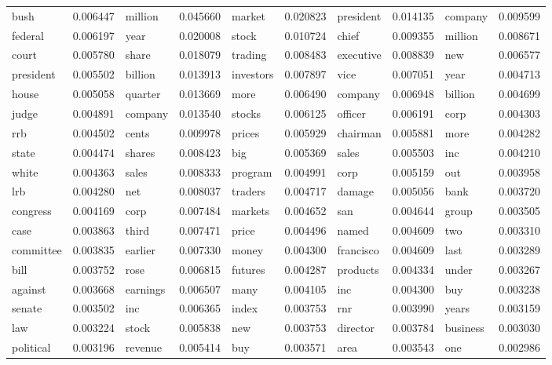 \begin{table}[!ht]
  \footnotesize
  \begin{tabular}{llllllllll}

bush & 0.006447 & million & 0.045660 & market & 0.020823 & president & 0.014135 & company & 0.009599\\
federal & 0.006197 & year & 0.020008 & stock & 0.010724 & chief & 0.009355 & million & 0.008671\\
court & 0.005780 & share & 0.018079 & trading & 0.008483 & executive & 0.008839 & new & 0.006577\\
president & 0.005502 & billion & 0.013913 & investors & 0.007897 & vice & 0.007051 & year & 0.004713\\
house & 0.005058 & quarter & 0.013669 & more & 0.006490 & company & 0.006948 & billion & 0.004699\\
judge & 0.004891 & company & 0.013540 & stocks & 0.006125 & officer & 0.006191 & corp & 0.004303\\
rrb & 0.004502 & cents & 0.009978 & prices & 0.005929 & chairman & 0.005881 & more & 0.004282\\
state & 0.004474 & shares & 0.008423 & big & 0.005369 & sales & 0.005503 & inc & 0.004210\\
white & 0.004363 & sales & 0.008333 & program & 0.004991 & corp & 0.005159 & out & 0.003958\\
lrb & 0.004280 & net & 0.008037 & traders & 0.004717 & damage & 0.005056 & bank & 0.003720\\
congress & 0.004169 & corp & 0.007484 & markets & 0.004652 & san & 0.004644 & group & 0.003505\\
case & 0.003863 & third & 0.007471 & price & 0.004496 & named & 0.004609 & two & 0.003310\\
committee & 0.003835 & earlier & 0.007330 & money & 0.004300 & francisco & 0.004609 & last & 0.003289\\
bill & 0.003752 & rose & 0.006815 & futures & 0.004287 & products & 0.004334 & under & 0.003267\\
against & 0.003668 & earnings & 0.006507 & many & 0.004105 & inc & 0.004300 & buy & 0.003238\\
senate & 0.003502 & inc & 0.006365 & index & 0.003753 & rnr & 0.003990 & years & 0.003159\\
law & 0.003224 & stock & 0.005838 & new & 0.003753 & director & 0.003784 & business & 0.003030\\
political & 0.003196 & revenue & 0.005414 & buy & 0.003571 & area & 0.003543 & one & 0.002986\\

\end{tabular}
\end{table}
